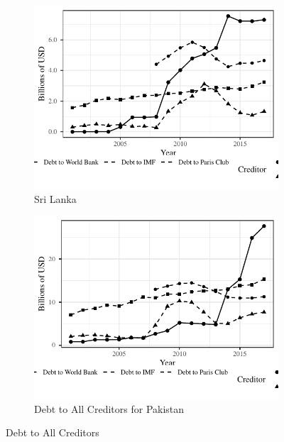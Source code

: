 \begin{figure}[t!]
    \centering
    \begin{subfigure}[position]{0.48\textwidth}
        \centering
        \includegraphics[width=\textwidth]{fig/ALL/Sri Lanka_debt_source.pdf}
        \caption{Sri Lanka}
        \label{fig: sri-lanka-debt-ts}
    \end{subfigure}
    \begin{subfigure}[position]{0.48\textwidth}
        \centering
        \includegraphics[width = \textwidth]{fig/ALL/Pakistan_debt_source.pdf}
        \caption{Debt to All Creditors for Pakistan}
        \label{fig: pakistan-debt-ts}
    \end{subfigure}
    \caption{Debt to All Creditors}
\end{figure}